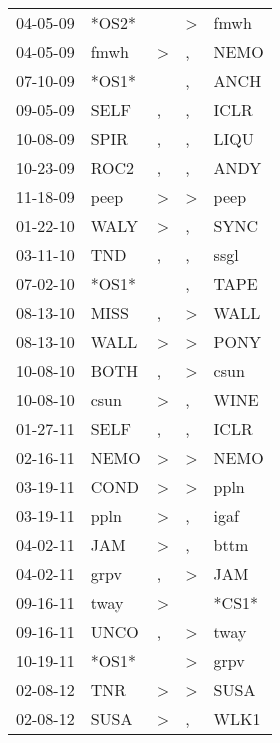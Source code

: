 \begin{supertabular}{lllll}
 04-05-09 &  *OS2* &               &     \textgreater &   fmwh \\
 04-05-09 &   fmwh &  \textgreater &                , &   NEMO \\
 07-10-09 &  *OS1* &               &                , &   ANCH \\
 09-05-09 &   SELF &             , &                , &   ICLR \\
 10-08-09 &   SPIR &             , &                , &   LIQU \\
 10-23-09 &   ROC2 &             , &                , &   ANDY \\
 11-18-09 &   peep &  \textgreater &     \textgreater &   peep \\
 01-22-10 &   WALY &  \textgreater &                , &   SYNC \\
 03-11-10 &    TND &             , &                , &   ssgl \\
 07-02-10 &  *OS1* &               &                , &   TAPE \\
 08-13-10 &   MISS &             , &     \textgreater &   WALL \\
 08-13-10 &   WALL &  \textgreater &     \textgreater &   PONY \\
 10-08-10 &   BOTH &             , &     \textgreater &   csun \\
 10-08-10 &   csun &  \textgreater &                , &   WINE \\
 01-27-11 &   SELF &             , &                , &   ICLR \\
 02-16-11 &   NEMO &  \textgreater &     \textgreater &   NEMO \\
 03-19-11 &   COND &  \textgreater &     \textgreater &   ppln \\
 03-19-11 &   ppln &  \textgreater &                , &   igaf \\
 04-02-11 &    JAM &  \textgreater &                , &   bttm \\
 04-02-11 &   grpv &             , &     \textgreater &    JAM \\
 09-16-11 &   tway &  \textgreater &                  &  *CS1* \\
 09-16-11 &   UNCO &             , &     \textgreater &   tway \\
 10-19-11 &  *OS1* &               &     \textgreater &   grpv \\
 02-08-12 &    TNR &  \textgreater &     \textgreater &   SUSA \\
 02-08-12 &   SUSA &  \textgreater &                , &   WLK1 \\

\end{supertabular}
